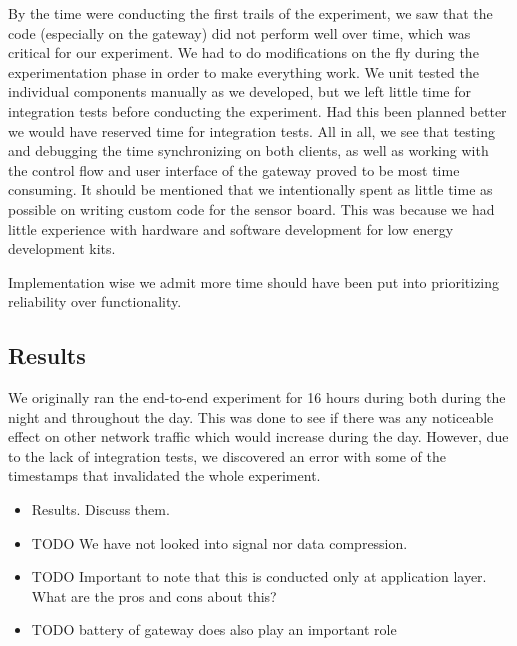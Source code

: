 By the time were conducting the first trails of the experiment, we saw that the code (especially on the gateway) did not perform well over time, which was critical for our experiment. We had to do modifications on the fly during the experimentation phase in order to make everything work. We unit tested the individual components manually as we developed, but we left little time for integration tests before conducting the experiment. Had this been planned better we would have reserved time for integration tests. All in all, we see that testing and debugging the time synchronizing on both clients, as well as working with the control flow and user interface of the gateway proved to be most time consuming. It should be mentioned that we intentionally spent as little time as possible on writing custom code for the sensor board. This was because we had little experience with hardware and software development for low energy development kits. 

Implementation wise we admit more time should have been put into prioritizing reliability over functionality.


\subsection{Results} %
\label{sub:results}


We originally ran the end-to-end experiment for 16 hours during both during the night and throughout the day. This was done to see if there was any noticeable effect on other network traffic which would increase during the day. However, due to the lack of integration tests, we discovered an error with some of the timestamps that invalidated the whole experiment.

\begin{itemize}

  \item Results. Discuss them.
  \item TODO We have not looked into signal nor data compression.
  \item TODO Important to note that this is conducted only at application layer. What are the pros and cons about this?
  \item TODO battery of gateway does also play an important role

\end{itemize}


